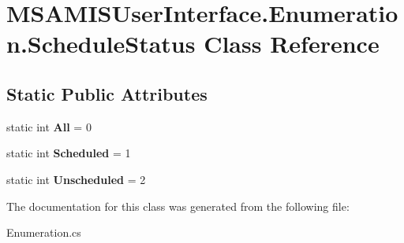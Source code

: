 \hypertarget{class_m_s_a_m_i_s_user_interface_1_1_enumeration_1_1_schedule_status}{}\section{M\+S\+A\+M\+I\+S\+User\+Interface.\+Enumeration.\+Schedule\+Status Class Reference}
\label{class_m_s_a_m_i_s_user_interface_1_1_enumeration_1_1_schedule_status}
\subsection*{Static Public Attributes}
\begin{DoxyCompactItemize}
\item 
\mbox{\label{class_m_s_a_m_i_s_user_interface_1_1_enumeration_1_1_schedule_status_a3e0d6329e693a7dce57f8b062a8d8659}} 
static int {\bfseries All} = 0
\item 
\mbox{\label{class_m_s_a_m_i_s_user_interface_1_1_enumeration_1_1_schedule_status_ac8c0305476112a95ad180fd1ef2b8bd8}} 
static int {\bfseries Scheduled} = 1
\item 
\mbox{\label{class_m_s_a_m_i_s_user_interface_1_1_enumeration_1_1_schedule_status_a737490fe5ab20229a3e52f5add783f47}} 
static int {\bfseries Unscheduled} = 2
\end{DoxyCompactItemize}


The documentation for this class was generated from the following file\+:\begin{DoxyCompactItemize}
\item 
Enumeration.\+cs\end{DoxyCompactItemize}
